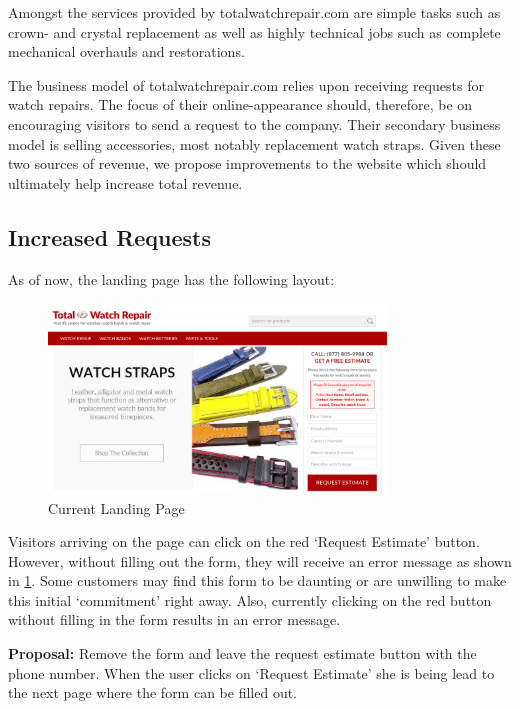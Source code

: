 \documentclass[12pt, authoryear]{elsarticle}
\begin{document}
Amongst the services provided by totalwatchrepair.com are simple tasks such as crown- and crystal replacement as well as highly technical jobs such as complete mechanical overhauls and restorations. 

The business model of totalwatchrepair.com relies upon receiving requests for watch repairs. The focus of their online-appearance should, therefore, be on encouraging visitors to send a request to the company. Their secondary business model is selling accessories, most notably replacement watch straps. Given these two sources of revenue, we propose improvements to the website which should ultimately help increase total revenue.

\subsection*{Increased Requests}
As of now, the landing page has the following layout:

\begin{figure}[!htp]
	\centering
	\includegraphics[clip, angle=0,width=0.8\textwidth]{LandingPage.png}
	\caption{ Current Landing Page}\label{LandingPage}
\end{figure}

Visitors arriving on the page can click on the red ‘Request Estimate’ button. However, without filling out the form, they will receive an error message as shown in \ref{LandingPage}. Some customers may find this form to be daunting or are unwilling to make this initial `commitment' right away.  Also, currently clicking on the red button without filling in the form results in an error message.

\textbf{Proposal:} Remove the form and leave the request estimate button with the phone number. When the user clicks on `Request Estimate' she is being lead to the next page where the form can be filled out.
\end{document}
